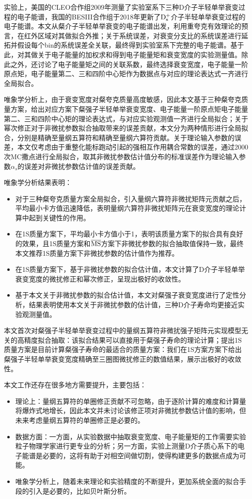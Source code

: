 实验上，美国的CLEO合作组2009年测量了实验室系下三种D介子半轻单举衰变过程的电子能谱，我国的BESIII合作组于2018年更新了$\mathrm{D_s^+}$介子半轻单举衰变过程的电子能谱。本文从粲介子半轻单举衰变的电子能谱出发，利用重夸克有效理论的预言，在红外区域对其做拟合外推；关于系统误差，对衰变分支比的系统误差进行延拓并假设每个bin的系统误差全关联，最终得到实验室系下完整的电子能谱。基于此，对其做关于电子能量的加权求和得到电子能量矩和衰变宽度的实验测量值。除此之外，还讨论了电子能量矩之间的关联系数，最终选择衰变宽度，电子能量一阶原点矩，电子能量第二、三和四阶中心矩作为数据点与对应的理论表达式一齐进行全局拟合。

唯象学分析上，由于衰变宽度对粲夸克质量高度敏感，因此本文基于三种粲夸克质量方案，给出对应方案下粲强子半轻单举衰变宽度、电子能量一阶原点矩电子能量第二、三和四阶中心矩的理论表达式，与对应实验观测值一齐进行全局拟合；关于幂次修正对于非微扰参数拟合抽取带来的误差贡献，本文分为两种情形进行全局拟合，分别是精确至量纲五算符和精确至量纲六算符贡献。关于理论输入参数的误差，本文仅考虑由于重整化能标跑动引起的强相互作用耦合常数的误差，通过2000次MC撒点进行全局拟合，取其非微扰参数估计值分布的标准误差作为理论输入参数$\alpha_s$的误差对非微扰参数估计值的误差贡献。

唯象学分析结果表明：
\begin{itemize}
    \item  对于三种粲夸克质量方案全局拟合，引入量纲六算符非微扰矩阵元贡献之后，平均最小卡方值迅速降低，表明量纲六算符非微扰矩阵元在衰变宽度的理论计算中起到关键性的作用。
    \item  在1S质量方案下，平均最小卡方值小于1，表明该质量方案下的拟合具有良好的效果，且1S质量方案和$\overline{\mathrm{MS}}$方案下非微扰参数的拟合抽取值保持一致，最终本文推荐1S质量方案下非微扰参数的估计值作为推荐。
    \item  在1S质量方案下，基于非微扰参数的拟合估计值，本文计算了D介子半轻单举衰变宽度的微扰修正和幂次修正，呈现出极好的收敛性。
    \item  基于本文关于非微扰参数的拟合估计值，本文对粲强子衰变宽度进行了定性分析，结果表明使用本文关于非微扰参数的估计值，三种D介子寿命均更接近实验观测量值。
\end{itemize}

本文首次对粲强子半轻单举衰变过程中的量纲五算符非微扰强子矩阵元实现模型无关的高精度拟合抽取：该拟合结果可以直接用于粲强子寿命的理论计算；提出1S质量方案是目前计算粲强子寿命的最适合的质量方案：我们在1S方案方案下给出粲强子半轻单举衰变宽度精确至三圈图微扰修正的数值结果，展示出极好的收敛性。

本文工作还存在很多地方需要提升，主要包括：
\begin{itemize}
    \item 理论上：量纲五算符的单圈修正贡献不可忽略，由于逐阶计算的难度和计算量将爆炸式地增长，因此本文并未讨论该修正项对非微扰参数估计值的影响，但未来考虑量纲五算符的单圈修正是必要的。
    \item 数据方面：一方面，从实验数据中抽取衰变宽度、电子能量矩的工作需要实验粒子物理学家进行更专业的分析；另一方面，实验上测量D介子质心系下的电子能谱是必要的，这将有助于对相空间做切割，使得构建更多的数据点成为可能。
    \item 唯象学分析上，随着未来理论和实验精度的不断提升，更加系统全面的拟合手段的引入是必要的，比如贝叶斯分析。
\end{itemize}

